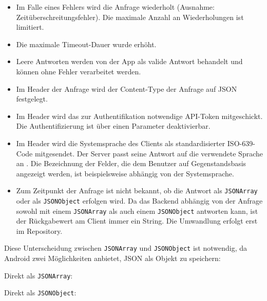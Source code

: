 \begin{itemize}
\tightlist
\item
  Im Falle eines Fehlers wird die Anfrage wiederholt (Ausnahme:
  Zeitüberschreitungsfehler). Die maximale Anzahl an Wiederholungen ist
  limitiert.
\item
  Die maximale Timeout-Dauer wurde erhöht.
\item
  Leere Antworten werden von der App als valide Antwort behandelt und
  können ohne Fehler verarbeitet werden.
\item
  Im Header der Anfrage wird der Content-Type der Anfrage auf JSON
  festgelegt.
\item
  Im Header wird das zur Authentifikation notwendige API-Token
  mitgeschickt. Die Authentifizierung ist über einen Parameter
  deaktivierbar.
\item
  Im Header wird die Systemsprache des Clients als standardisierter
  ISO-639-Code mitgesendet. Der Server passt seine Antwort auf die
  verwendete Sprache an \cite{ISO-639}. Die Bezeichnung der Felder, die
  dem Benutzer auf Gegenstandsbasis angezeigt werden, ist beispielsweise
  abhängig von der Systemsprache.
\item
  Zum Zeitpunkt der Anfrage ist nicht bekannt, ob die Antwort als
  \texttt{JSONArray} oder als \texttt{JSONObject} erfolgen wird. Da das
  Backend abhängig von der Anfrage sowohl mit einem \texttt{JSONArray}
  als auch einem \texttt{JSONObject} antworten kann, ist der
  Rückgabewert am Client immer ein String. Die Umwandlung erfolgt erst
  im Repository.
\end{itemize}

Diese Unterscheidung zwischen \texttt{JSONArray} und \texttt{JSONObject}
ist notwendig, da Android zwei Möglichkeiten anbietet, JSON als Objekt
zu speichern:

Direkt als \texttt{JSONArray}:

\begin{Shaded}
\begin{Highlighting}[]
 
\end{Highlighting}
\end{Shaded}

Direkt als \texttt{JSONObject}:

\begin{Shaded}
\begin{Highlighting}[]
 
\end{Highlighting}
\end{Shaded}

